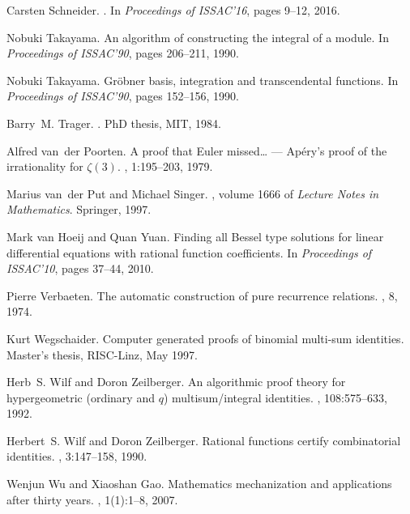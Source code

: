 \documentclass{jssc}
\begin{document}
\begin{thebibliography}{199}
Carsten Schneider.
.
\newblock In {\em Proceedings of ISSAC'16}, pages 9--12, 2016.

Nobuki Takayama.
\newblock An algorithm of constructing the integral of a module.
\newblock In {\em Proceedings of ISSAC'90}, pages 206--211, 1990.

Nobuki Takayama.
\newblock Gr{\"o}bner basis, integration and transcendental functions.
\newblock In {\em Proceedings of ISSAC'90}, pages 152--156, 1990.

Barry~M. Trager.
.
\newblock PhD thesis, MIT, 1984.

Alfred van~der Poorten.
\newblock A proof that {E}uler missed\dots{} --- {A}p{\'e}ry's proof of the
  irrationality for $\zeta(3)$.
, 1:195--203, 1979.

Marius van~der Put and Michael Singer.
, volume 1666 of {\em
  Lecture Notes in Mathematics}.
\newblock Springer, 1997.

Mark van Hoeij and Quan Yuan.
\newblock Finding all {B}essel type solutions for linear differential equations
  with rational function coefficients.
\newblock In {\em Proceedings of ISSAC'10}, pages 37--44, 2010.

Pierre Verbaeten.
\newblock The automatic construction of pure recurrence relations.
, 8, 1974.

Kurt Wegschaider.
\newblock Computer generated proofs of binomial multi-sum identities.
\newblock Master's thesis, RISC-Linz, May 1997.

Herb~S. Wilf and Doron Zeilberger.
\newblock An algorithmic proof theory for hypergeometric (ordinary and $q$)
  multisum/integral identities.
, 108:575--633, 1992.

Herbert~S. Wilf and Doron Zeilberger.
\newblock Rational functions certify combinatorial identities.
, 3:147--158, 1990.

Wenjun Wu and Xiaoshan Gao.
\newblock Mathematics mechanization and applications after thirty years.
, 1(1):1--8, 2007.


\end{thebibliography}
\end{document}
